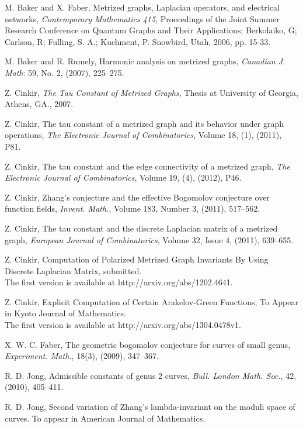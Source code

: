 \documentclass[12pt]{amsart}
\theoremstyle{example}
\theoremstyle{definition}
\theoremstyle{notation}
\begin{document}
\begin{thebibliography}{999}

 M. Baker and X. Faber, Metrized graphs, Laplacian operators, and
electrical networks, {\em Contemporary Mathematics 415}, Proceedings of the Joint Summer Research Conference
on Quantum Graphs and Their Applications; Berkolaiko, G; Carlson, R; Fulling, S. A.; Kuchment,
P. Snowbird, Utah, 2006, pp. 15-33.

 M. Baker and R. Rumely, Harmonic analysis on metrized graphs,
{\em Canadian J. Math}: 59, No. 2, (2007), 225--275.

 Z. Cinkir, {\em The Tau Constant of Metrized Graphs},
Thesis at University of Georgia, Athens, GA., 2007.

 Z. Cinkir, The tau constant of a metrized graph and its behavior under graph operations, {\em The Electronic Journal of Combinatorics}, Volume 18, (1), (2011), P81.

 Z. Cinkir, The tau constant and the edge connectivity of a metrized graph,
{\em The Electronic Journal of Combinatorics}, Volume 19, (4), (2012), P46.

 Z. Cinkir, Zhang's conjecture and the effective Bogomolov conjecture over function fields, {\em Invent. Math.}, Volume 183, Number 3, (2011), 517--562.

 Z. Cinkir, The tau constant and the discrete Laplacian matrix of a metrized graph, {\em European Journal of Combinatorics}, Volume 32, Issue 4, (2011), 639--655.

 Z. Cinkir, Computation of Polarized Metrized Graph Invariants By Using Discrete Laplacian Matrix, submitted.
\\The first version is available at http://arxiv.org/abs/1202.4641.

 Z. Cinkir, Explicit Computation of Certain Arakelov-Green Functions, To Appear in Kyoto Journal of
    Mathematics.
\\The first version is available at http://arxiv.org/abs/1304.0478v1.

 X. W. C. Faber, The geometric bogomolov conjecture for curves of small genus,
{\em Experiment. Math.}, 18(3), (2009), 347--367.

 R. D. Jong, Admissible constants of genus $2$ curves, {\em Bull. London Math. Soc.}, 42, (2010), 405--411.

 R. D. Jong, Second variation of Zhang's lambda-invariant on the moduli space of curves. To appear in
American Journal of Mathematics.


\end{thebibliography}
\end{document}
